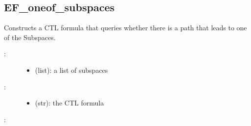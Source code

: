 \documentclass[letterpaper,10pt,english]{sphinxmanual}
\begin{document}
\subsection{EF\_oneof\_subspaces}
\label{\detokenize{TemporalLogic:ef-oneof-subspaces}}

\begin{fulllineitems}
\label{\detokenize{TemporalLogic:PyBoolNet.TemporalLogic.EF_oneof_subspaces}}
Constructs a CTL formula that queries whether there is a path that leads to one of the Subspaces.
\begin{description}
\item[{:}] \leavevmode\begin{itemize}
\item {} 
 (list): a list of subspaces

\end{itemize}

\item[{:}] \leavevmode\begin{itemize}
\item {} 
 (str): the CTL formula

\end{itemize}

\end{description}

:

\begin{sphinxVerbatim}[commandchars=\\\{\}]
  \PYG{p}{[} \PYG{p}{]}
 
\end{sphinxVerbatim}

\end{fulllineitems}
\end{document}
